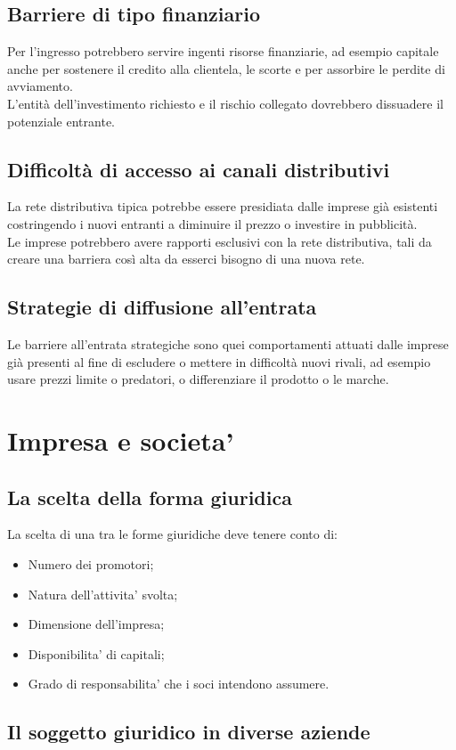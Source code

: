 \documentclass{report}
\begin{document}
	\section{Barriere di tipo finanziario}
	Per l'ingresso potrebbero servire ingenti risorse finanziarie, ad esempio capitale anche per sostenere il credito alla clientela, le scorte e per assorbire le perdite di avviamento. \medskip \\L'entità dell'investimento richiesto e il rischio collegato dovrebbero dissuadere il potenziale entrante.
	\section{Difficoltà di accesso ai canali distributivi}
	La rete distributiva tipica potrebbe essere presidiata dalle imprese già esistenti costringendo i nuovi entranti a diminuire il prezzo o investire in pubblicità.\medskip \\Le imprese potrebbero avere rapporti esclusivi con la rete distributiva, tali da creare una barriera così alta da esserci bisogno di una nuova rete.
	\section{Strategie di diffusione all'entrata}
	Le barriere all'entrata strategiche sono quei comportamenti attuati dalle imprese già presenti al fine di escludere o mettere in difficoltà nuovi rivali, ad esempio usare prezzi limite o predatori, o differenziare il prodotto o le marche.
	
	\chapter{Impresa e societa'}
	\section{La scelta della forma giuridica}
	La scelta di una tra le forme giuridiche deve tenere conto di:
	\begin{itemize}
		\item Numero dei promotori;
		\item Natura dell'attivita' svolta;
		\item Dimensione dell'impresa;
		\item Disponibilita' di capitali;
		\item Grado di responsabilita' che i soci intendono assumere.
	\end{itemize}
	\section{Il soggetto giuridico in diverse aziende}
\end{document}
